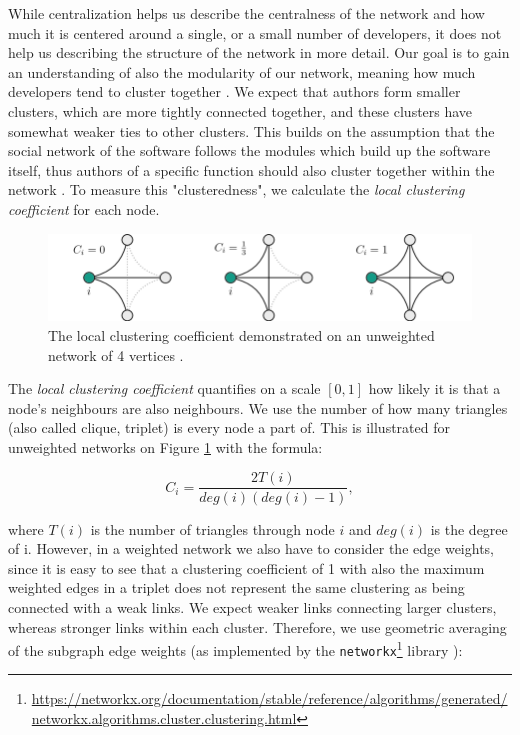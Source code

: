 While centralization helps us describe the centralness of the network and how much it is centered around a single, or a small number of developers, it does not help us describing the structure of the network in more detail. Our goal is to gain an understanding of also the modularity of our network, meaning how much developers tend to cluster together \cite{joblinEvolutionaryTrendsDeveloper2017}. We expect that authors form smaller clusters, which are more tightly connected together, and these clusters have somewhat weaker ties to other clusters. This builds on the assumption that the social network of the software follows the modules which build up the software itself, thus authors of a specific function should also cluster together within the network \cite{conwayHowCommitteesInvent1968, joblinEvolutionaryTrendsDeveloper2017}. To measure this "clusteredness", we calculate the \textit{local clustering coefficient} for each node.

\begin{figure}
    \centering
    \includegraphics[width=1\textwidth]{figures/loc_clust_coeff.png}
    \caption{The local clustering coefficient demonstrated on an unweighted network of 4 vertices \cite{jedrzejewskiRoleComplexNetworks2016}.}
    \label{fig:loc clust coeff}
\end{figure}

The \textit{local clustering coefficient} quantifies on a scale $[0, 1]$ how likely it is that a node's neighbours are also neighbours. We use the number of how many triangles (also called clique, triplet) is every node a part of. This is illustrated for unweighted networks on Figure \ref{fig:loc clust coeff} with the formula:

\[ C_i = \frac{2T(i)}{deg(i)(deg(i)-1)}, \]

where $T(i)$ is the number of triangles through node $i$ and $deg(i)$ is the degree of i. However, in a weighted network we also have to consider the edge weights, since it is easy to see that a clustering coefficient of 1 with also the maximum weighted edges in a triplet does not represent the same clustering as being connected with a weak links. We expect weaker links connecting larger clusters, whereas stronger links within each cluster. Therefore, we use geometric averaging of the subgraph edge weights (as implemented by the \texttt{networkx}\footnote{\url{https://networkx.org/documentation/stable/reference/algorithms/generated/networkx.algorithms.cluster.clustering.html}} library \cite{onnelaIntensityCoherenceMotifs2005}):

